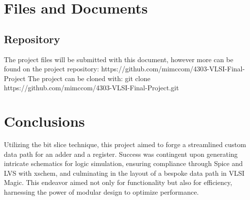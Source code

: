 \documentclass{article}
\begin{document}
\section{Files and Documents}
\subsection{Repository}
The project files will be submitted with this document, however more can be found on the project repository:
\newline \newline
\indent https://github.com/mimccom/4303-VLSI-Final-Project
\newline \newline
The project can be cloned with:
\newline \newline
\indent git clone https://github.com/mimccom/4303-VLSI-Final-Project.git

\section{Conclusions}
Utilizing the bit slice technique, this project aimed to forge a streamlined custom data path for an adder and a register. Success was contingent upon generating intricate schematics for logic simulation, ensuring compliance through Spice and LVS with xschem, and culminating in the layout of a bespoke data path in VLSI Magic. This endeavor aimed not only for functionality but also for efficiency, harnessing the power of modular design to optimize performance.
\end{document}
